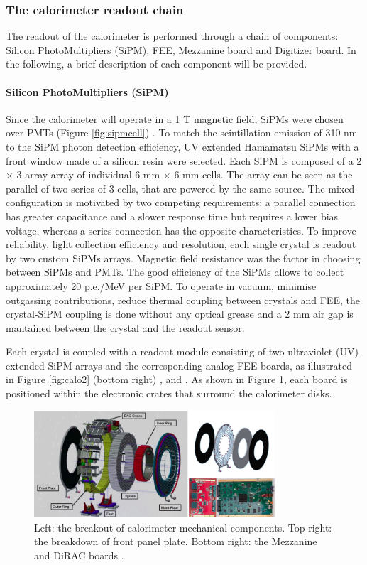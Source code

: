 \subsubsection{The calorimeter readout chain}
The readout of the calorimeter is performed through a chain of components: Silicon PhotoMultipliers (SiPM), 
FEE, Mezzanine board and Digitizer board. In the following, 
a brief description of each component will be provided.
\paragraph{Silicon PhotoMultipliers (SiPM)}
Since the calorimeter will operate in a 1 T magnetic field, SiPMs were chosen over PMTs (Figure \ref{fig:sipmcell}) \cite{em1}. 
To match the scintillation emission of 310 nm to the SiPM photon detection efficiency, 
UV extended Hamamatsu SiPMs with a front window made of a silicon resin were selected. Each SiPM is composed of a
2 $\times$ 3 array array of individual 6 mm $\times$ 6 mm cells.
The array can be seen as the parallel of two series of 3 cells, that 
are powered by the same source. The mixed configuration is motivated by 
two competing requirements: a parallel connection has greater capacitance
and a slower response time 
but requires a lower bias voltage, whereas 
a series connection has the opposite characteristics. 
To improve reliability, light collection efficiency and resolution, each single 
crystal is readout by two custom SiPMs arrays.
Magnetic field resistance was the factor in choosing between SiPMs and PMTs.
The good efficiency of the SiPMs allows to collect approximately 20 p.e./MeV per SiPM.
To operate in vacuum, minimise outgassing contributions, reduce 
thermal coupling between crystals and FEE, the crystal-SiPM 
coupling is done without any optical grease and a 2 mm air gap is mantained 
between the crystal and the readout sensor.


Each crystal is coupled with a readout 
module consisting of two ultraviolet (UV)-extended SiPM arrays
and the corresponding analog FEE boards, as illustrated in Figure 
\ref{fig:calo2} (bottom right) \cite{em5}, \cite{em2} and \cite{em3}. 
As shown in Figure \ref{fig:calo3}, each board is positioned within the electronic 
crates that surround the calorimeter disks.
\begin{figure}[!h]
        \centering
        \includegraphics[width =0.8\textwidth]{figures/png/Screenshot_20240322_121017.png}
        \caption[The breakout of calorimeter mechanical components.]{Left: the breakout of calorimeter mechanical components. Top right: the breakdown of front
        panel plate. Bottom right: the Mezzanine and DiRAC boards \cite{em4}.}
        \label{fig:calo3}
        \end{figure}


